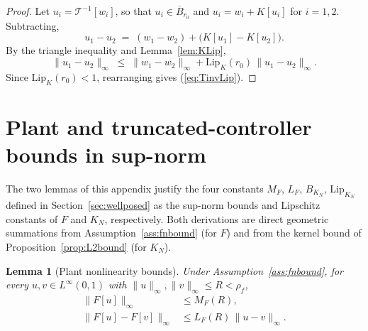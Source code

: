 \documentclass[amsthm]{autart}
\theoremstyle{plain}
\newtheorem{lemma}{Lemma}
\theoremstyle{definition}
\newcommand{\Tcal}{\mathcal{T}}
\newcommand{\Linf}{L^\infty}
\newcommand{\Lipk}{\mathrm{Lip}_K}
\newcommand{\LipKn}{\mathrm{Lip}_{K_N}}
\newcommand{\Bball}{\overline{B}}
\begin{document}
\begin{proof}
Let $u_i = \Tcal^{-1}[w_i]$, so that $u_i \in \Bball_{r_0}$ and $u_i = w_i + K[u_i]$ for $i = 1, 2$. Subtracting,
\begin{equation}
u_1 - u_2 \;=\; (w_1 - w_2) + \bigl(K[u_1] - K[u_2]\bigr).
\label{eq:u1u2_diff}
\end{equation}
By the triangle inequality and Lemma~\ref{lem:KLip},
\begin{equation}
\|u_1 - u_2\|_\infty \;\le\; \|w_1 - w_2\|_\infty + \Lipk(r_0)\,\|u_1 - u_2\|_\infty.
\label{eq:u1u2_bound}
\end{equation}
Since $\Lipk(r_0) < 1$, rearranging gives (\ref{eq:TinvLip}).
\end{proof}

\section{Plant and truncated-controller bounds in sup-norm}\label{app:Fbounds}

The two lemmas of this appendix justify the four constants $M_F$, $L_F$, $B_{K_N}$, $\LipKn$ defined in Section~\ref{sec:wellposed} as the sup-norm bounds and Lipschitz constants of $F$ and $K_N$, respectively. Both derivations are direct geometric summations from Assumption~\ref{ass:fnbound} (for $F$) and from the kernel bound of Proposition~\ref{prop:L2bound} (for $K_N$).

\begin{lemma}[Plant nonlinearity bounds]\label{lem:Fbounds}
Under Assumption~\ref{ass:fnbound}, for every $u, v \in \Linf(0,1)$ with $\|u\|_\infty, \|v\|_\infty \le R < \rho_f$,
\begin{align}
\|F[u]\|_\infty &\le M_F(R), \label{eq:Fbound}\\
\|F[u] - F[v]\|_\infty &\le L_F(R)\,\|u - v\|_\infty. \label{eq:Flip}
\end{align}
\end{lemma}
\end{document}
